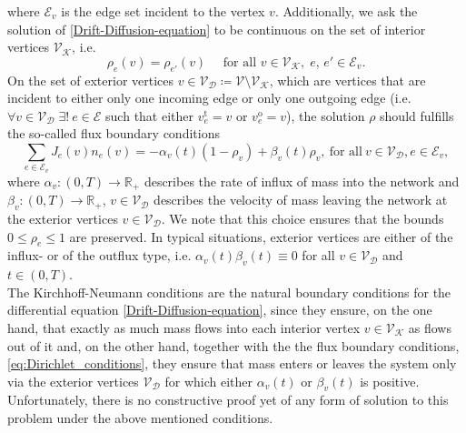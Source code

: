 where $\mathcal{E}_v$ is the edge set incident to the vertex $v$. Additionally, we ask the solution of \cref{Drift-Diffusion-equation} to be continuous on the set of interior vertices $\mathcal{V}_\mathcal{K}$, i.e. 
\begin{equation}
    \label{continuous on vertices}
    \rho_e(v) = \rho_{e'}(v) \quad \text{ for all }v \in \mathcal{V}_\mathcal{K},\; e,\,e' \in \mathcal{E}_v.
\end{equation}
On the set of exterior vertices $v \in \mathcal{V}_\mathcal{D} \coloneqq \mathcal{V} \setminus \mathcal{V}_\mathcal{K}$, which are vertices that are incident to either only one incoming edge or only one outgoing edge (i.e. $\forall v \in \mathcal{V}_\mathcal{D} \; \exists! \ e \in \mathcal{E}$ such that either $v^{\operatorname{t}}_{e} = v$ or $v^{\operatorname{o}}_{e} = v$), the solution $\rho$ should fulfills the so-called flux boundary conditions
\begin{equation}
    \label{eq:Dirichlet_conditions}
    \sum_{e\in \mathcal{E}_v}J_e(v) n_e (v)=-\alpha_v(t) (1-\rho_v) + \beta_v(t) \rho_v,\ \text{for all}\ v \in \mathcal{V}_\mathcal{D}, e \in \mathcal{E}_v,
\end{equation}
where $\alpha_v \colon (0,T) \to \mathbb{R}_{+}$ describes the rate of influx of mass into the network and $\beta_v \colon (0,T) \to \mathbb{R}_{+}$, ${v \in \mathcal{V}_\mathcal{D}}$ describes the velocity of mass leaving the network at the exterior vertices $v \in \mathcal{V}_\mathcal{D}$. We note that this choice ensures that the bounds $0 \leq \rho_e \leq 1$ are preserved. In typical situations, exterior vertices are either of the influx- or of the outflux type, i.e. $\alpha_v(t) \beta_v(t) \equiv 0$ for all $v \in \mathcal{V}_\mathcal{D}$ and $t \in (0,T)$. \\
The Kirchhoff-Neumann conditions are the natural boundary conditions for the differential equation \eqref{Drift-Diffusion-equation}, since they ensure, on the one hand, that exactly as much mass flows into each interior vertex $v \in \mathcal{V}_{\mathcal{K}}$ as flows out of it and, on the other hand, together with the the flux boundary conditions, \cref{eq:Dirichlet_conditions}, they ensure that mass enters or leaves the system only via the exterior vertices $\mathcal{V}_\mathcal{D}$ for which either $\alpha_v(t)$ or $\beta_v(t)$ is positive. \\

Unfortunately, there is no constructive proof yet of any form of solution to this problem under the above mentioned conditions. \\

